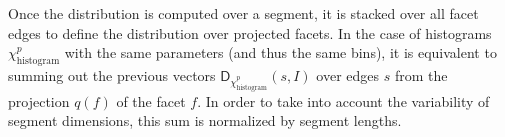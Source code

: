         \begin{figure}[htpb]
            \begin{center}
            \end{center}
        \end{figure}

        Once the distribution is computed over a segment, it is stacked over all facet edges to define the distribution over projected facets.
        In the case of histograms $\chi^p_{\operatorname{histogram}}$ with the same parameters (and thus the same bins), it is equivalent to summing out the previous vectors $\mathsf{D}_{\chi^p_{\operatorname{histogram}}}(s, I)$ over edges $s$ from the projection $q\left(f\right)$ of the facet $f$.
        In order to take into account the variability of segment dimensions, this sum is normalized by segment lengths.

